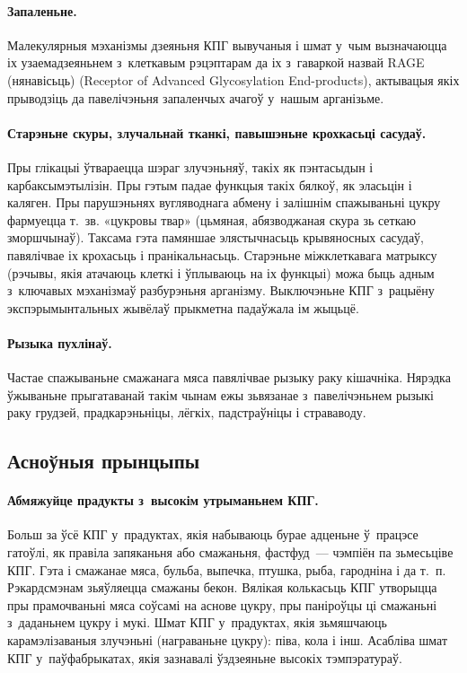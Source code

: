 \paragraph{Запаленьне.}
Малекулярныя мэханізмы дзеяньня КПГ вывучаныя і шмат у~чым вызначаюцца іх узаемадзеяньнем з~клеткавым рэцэптарам да іх з~гаваркой назвай RAGE (нянавісьць) (Receptor of Advanced Glycosylation End-products), актывацыя якіх прыводзіць да павелічэньня запаленчых ачагоў у~нашым арганізьме.

\paragraph{Старэньне скуры, злучальнай тканкі, павышэньне крохкасьці сасудаў.}
Пры глікацыі ўтвараецца шэраг злучэньняў, такіх як пэнтасыдын і карбаксымэтылізін. Пры гэтым падае функцыя такіх бялкоў, як эласьцін і каляген. Пры парушэньнях вугляводнага абмену і залішнім спажываньні цукру фармуецца т.~зв. «цукровы твар» (цьмяная, абязводжаная скура зь сеткаю зморшчынаў). Таксама гэта памяншае элястычнасьць крывяносных сасудаў, павялічвае іх крохасьць і пранікальнасьць. Старэньне міжклеткавага матрыксу (рэчывы, якія атачаюць клеткі і ўплываюць на іх функцыі) можа быць адным з~ключавых мэханізмаў разбурэньня арганізму. Выключэньне КПГ з~рацыёну экспэрымынтальных жывёлаў прыкметна падаўжала ім жыцьцё.


\paragraph{Рызыка пухлінаў.}
Частае спажываньне смажанага мяса павялічвае рызыку раку кішачніка. Нярэдка ўжываньне прыгатаванай такім чынам ежы зьвязанае з~павелічэньнем рызыкі раку грудзей, прадкарэньніцы, лёгкіх, падстраўніцы і страваводу.

\subsection{Асноўныя прынцыпы}

\paragraph{Абмяжуйце прадукты з~высокім утрыманьнем КПГ.}
Больш за ўсё КПГ у~прадуктах, якія набываюць бурае адценьне ў~працэсе гатоўлі, як правіла запяканьня або смажаньня, фастфуд~--- чэмпіён па зьмесьціве КПГ. Гэта і смажанае мяса, бульба, выпечка, птушка, рыба, гародніна і да т.~п. Рэкардсмэнам зьяўляецца смажаны бекон. Вялікая колькасьць КПГ утворыцца пры прамочваньні мяса соўсамі на аснове цукру, пры паніроўцы ці смажаньні з~даданьнем цукру і мукі. Шмат КПГ у~прадуктах, якія зьмяшчаюць карамэлізаваныя злучэньні (награваньне цукру): піва, кола і інш. Асабліва шмат КПГ у~паўфабрыкатах, якія зазнавалі ўздзеяньне высокіх тэмпэратураў.

